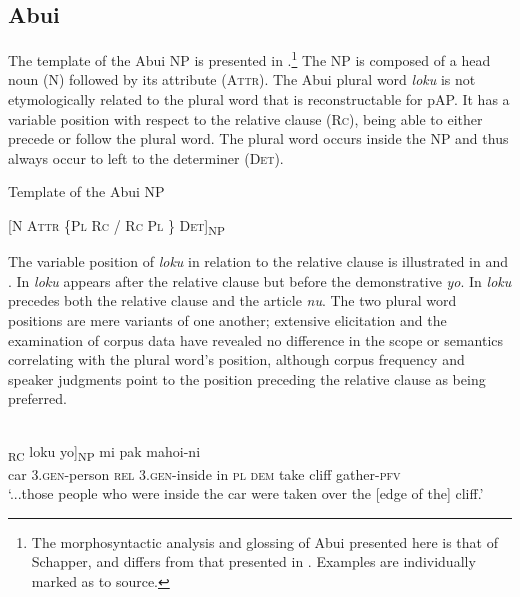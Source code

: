 \subsection{Abui} %
\label{sec:9:3.4}
The template of the Abui NP is presented in .\footnote{  The morphosyntactic analysis and glossing of Abui presented here is that of Schapper, and differs from that presented in \citet{Kratochvil2007}. Examples are individually marked as to source.} The NP is composed of a head noun (N) followed by its attribute (\textsc{Attr).} The Abui plural word \textit{loku} is not etymologically related to the plural word that is reconstructable for pAP. It has a variable position with respect to the relative clause (\textsc{Rc}), being able to either precede or follow the plural word. The plural word occurs inside the NP and thus always occur to left to the determiner (\textsc{Det).}

\ea%
\label{ex:9:46}

 Template of the Abui NP

[\textsc{N  Attr  \{Pl  Rc  /  Rc  Pl \} Det}]\textsubscript{NP}
\z

The variable position of \textit{loku} in relation to the relative clause is illustrated in  and . In  \textit{loku} appears after the relative clause but before the demonstrative \textit{yo}. In  \textit{loku} precedes both the relative clause and the article \textit{nu}. The two plural word positions are mere variants of one another; extensive elicitation and the examination of corpus data have revealed no difference in the scope or semantics correlating with the plural word's position, although corpus frequency and speaker judgments point to the position preceding the relative clause as being preferred.


\ea%
\label{ex:9:47}
 \\
\gll  [...oto he-amakaang [{ba} h-omi {mia}]\textsubscript{RC} loku yo]\textsubscript{NP}  mi pak mahoi-ni \\
  car \textsc{3.gen}-person \textsc{rel} \textsc{3.gen}-inside in \textsc{pl} \textsc{dem}   take cliff gather-\textsc{pfv}  \\
\glt `...those people who were inside the car were taken over the [edge of the] cliff.'
\z
 

